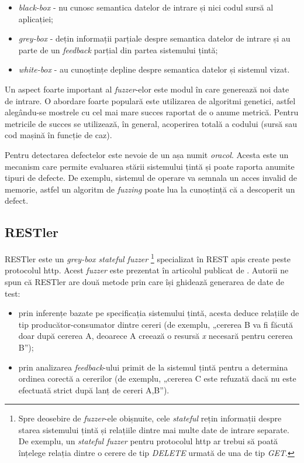 \begin{itemize}
    \item \textit{black-box} - nu cunosc semantica datelor de intrare și nici codul sursă al aplicației;
    \item \textit{grey-box} - dețin informații parțiale despre semantica datelor de intrare și au parte de un \textit{feedback} parțial din partea sistemului țintă;
    \item \textit{white-box} - au cunoștințe depline despre semantica datelor și sistemul vizat.
\end{itemize}

Un aspect foarte important al \textit{fuzzer}-elor este modul în care generează noi date de intrare. O abordare foarte populară este utilizarea de algoritmi genetici, astfel alegându-se mostrele cu cel mai mare succes raportat de o anume metrică. Pentru metricile de succes se utilizează, în general, acoperirea totală a codului (sursă sau cod mașină în funcție de caz).

Pentru detectarea defectelor este nevoie de un așa numit \textit{oracol}. Acesta este un mecanism care permite evaluarea stării sistemului țintă și poate raporta anumite tipuri de defecte. De exemplu, sistemul de operare va semnala un acces invalid de memorie, astfel un algoritm de \textit{fuzzing} poate lua la cunoștință că a descoperit un defect.

\subsection*{RESTler}

RESTler este un \textit{grey-box stateful fuzzer} \footnote{Spre deosebire de \textit{fuzzer}-ele obișnuite, cele \textit{stateful} rețin informații despre starea sistemului țintă și relațiile dintre mai multe date de intrare separate. De exemplu, un \textit{stateful fuzzer} pentru protocolul \acrshort{http} ar trebui să poată înțelege relația dintre o cerere de tip \textit{DELETE} urmată de una de tip \textit{GET}.} specializat în REST \acrshort{api}s create peste protocolul \acrshort{http}. Acest \textit{fuzzer} este prezentat în articolul publicat de \citet{Atlidakis2019}. Autorii ne spun că RESTler are două metode prin care își ghidează generarea de date de test:

\begin{itemize}
    \item prin inferențe bazate pe specificația sistemului țintă, acesta deduce relațiile de tip producător-consumator dintre cereri (de exemplu, „cererea B va fi făcută doar după cererea A, deoarece A creează o resursă \textit{x} necesară pentru cererea B”);
    \item prin analizarea \textit{feedback}-ului primit de la sistemul țintă pentru a determina ordinea corectă a cererilor (de exemplu, „cererea C este refuzată dacă nu este efectuată strict după lanț de cereri A,B”).
\end{itemize}

